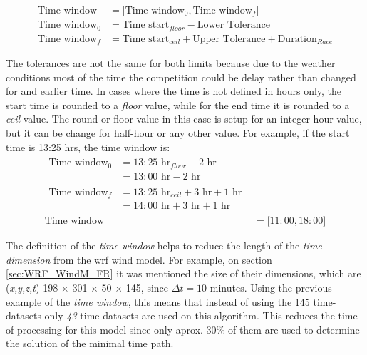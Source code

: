 \begin{align} %
    \textrm{Time window} &=\big[\textrm{Time window}_{0},  \textrm{Time window}_{f} \big]\label{eq:time_window}\\
    \textrm{Time window}_{0}&=\textrm{Time start}_{floor}-\textrm{Lower Tolerance} \label{eq:time_window0}\\
    \textrm{Time window}_{f}&=\textrm{Time start}_{ceil}+\textrm{Upper Tolerance}+\textrm{Duration}_{Race} \label{eq:time_windowf}
\end{align}

The tolerances are not the same for both limits because due to the weather conditions most of the time the competition could be delay rather than changed for and earlier time. In cases where the time is not defined in hours only, the start time is rounded to a \textit{floor} value, while for the end time it is rounded to a \textit{ceil} value. The round or floor value in this case is setup for an integer hour value, but it can be change for half-hour or any other value. For example, if the start time is 13:25 hrs, the time window is:
\begin{align} %
   \begin{split}
        \textrm{Time window}_{0}&= 13:25\textrm{ hr}_{floor} -\textrm{2 hr}\\ 
        &= 13:00\textrm{ hr} - 2\textrm{ hr}
   \end{split} \label{eq:time_window0Ex}\\
    \begin{split}
        \textrm{Time window}_{f}&=13:25\textrm{ hr}_{ceil}+\textrm{3 hr}+\textrm{1 hr}\\
        &= 14:00 \textrm{ hr} + 3\textrm{ hr} +1 \textrm{ hr} \label{eq:time_windowfEx}
    \end{split}
    \\
    \textrm{Time window} &= \big[11:00,18:00 \big]
\end{align}

The definition of the \textit{time window} helps to reduce the length of the \textit{time dimension} from the \acrshort{wrf} wind model. For example, on section  \ref{sec:WRF_WindM_FR} it was mentioned the size of their dimensions, which are (\textit{x,y,z,t}) 198 $\times$ 301 $\times$ 50 $\times$ 145, since $\Delta t = 10$ minutes. Using the previous example of the \textit{time window}, this means that instead of using the 145 time-datasets only \textit{43} time-datasets are used on this algorithm. This reduces the time of processing for this model since only aprox. $30\%$ of them are used to determine the solution of the minimal time path.\par 

